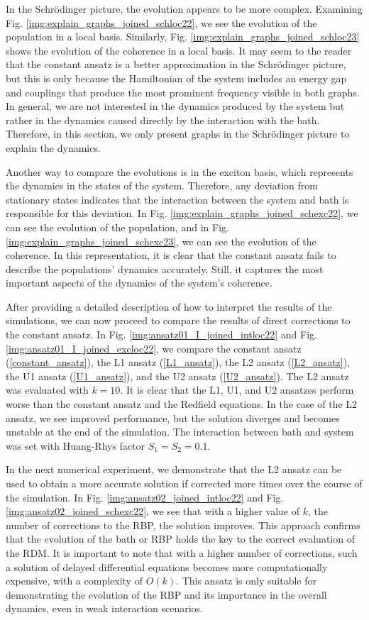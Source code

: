 In the Schrödinger picture, the evolution appears to be more complex. Examining Fig. \ref{img:explain_graphs_joined_schloc22}, we see the evolution of the population in a local basis. Similarly, Fig. \ref{img:explain_graphs_joined_schloc23} shows the evolution of the coherence in a local basis. It may seem to the reader that the constant ansatz is a better approximation in the Schrödinger picture, but this is only because the Hamiltonian of the system includes an energy gap and couplings that produce the most prominent frequency visible in both graphs. In general, we are not interested in the dynamics produced by the system but rather in the dynamics caused directly by the interaction with the bath. Therefore, in this section, we only present graphs in the Schrödinger picture to explain the dynamics. 

Another way to compare the evolutions is in the exciton basis, which represents the dynamics in the states of the system. Therefore, any deviation from stationary states indicates that the interaction between the system and bath is responsible for this deviation. In Fig.  \ref{img:explain_graphs_joined_schexc22}, we can see the evolution of the population, and in Fig. \ref{img:explain_graphs_joined_schexc23}, we can see the evolution of the coherence. In this representation, it is clear that the constant ansatz fails to describe the populations' dynamics accurately. Still, it captures the most important aspects of the dynamics of the system's coherence. 

After providing a detailed description of how to interpret the results of the simulations, we can now proceed to compare the results of direct corrections to the constant ansatz. In Fig. \ref{img:ansatz01_I_joined_intloc22} and Fig. \ref{img:ansatz01_I_joined_excloc22}, we compare the constant ansatz (\ref{constant_ansatz}), the L1 ansatz (\ref{L1_ansatz}), the L2 ansatz (\ref{L2_ansatz}), the U1 ansatz (\ref{U1_ansatz}), and the U2 ansatz (\ref{U2_ansatz}). The L2 ansatz was evaluated with $k=10$. It is clear that the L1, U1, and U2 ansatzes perform worse than the constant ansatz and the Redfield equations. In the case of the L2 ansatz, we see improved performance, but the solution diverges and becomes unstable at the end of the simulation. The interaction between bath and system was set with Huang-Rhys factor $S_1=S_2=0.1$. 

In the next numerical experiment, we demonstrate that the L2 ansatz can be used to obtain a more accurate solution if corrected more times over the course of the simulation. In Fig. \ref{img:ansatz02_joined_intloc22} and Fig. \ref{img:ansatz02_joined_schexc22}, we see that with a higher value of $k$, the number of corrections to the RBP, the solution improves. This approach confirms that the evolution of the bath or RBP holds the key to the correct evaluation of the RDM. It is important to note that with a higher number of corrections, such a solution of delayed differential equations becomes more computationally expensive, with a complexity of $O(k)$. This ansatz is only suitable for demonstrating the evolution of the RBP and its importance in the overall dynamics, even in weak interaction scenarios. 

